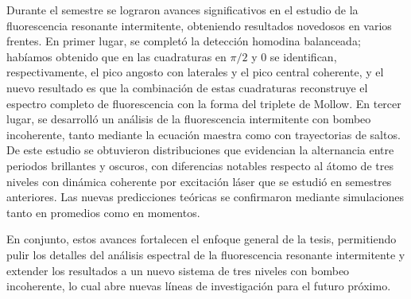 \documentclass[12pt]{article}
\begin{document}
Durante el semestre se lograron avances significativos en el estudio de la fluorescencia resonante intermitente, obteniendo resultados novedosos en varios frentes. En primer lugar, se completó la detección homodina balanceada; habíamos obtenido que en las cuadraturas en $\pi/2$ y $0$ se identifican, respectivamente, el pico angosto con laterales y el pico central coherente, y el nuevo resultado es que la combinación de estas cuadraturas reconstruye el espectro completo de fluorescencia con la forma del triplete de Mollow. En tercer lugar, se desarrolló un análisis de la fluorescencia intermitente con bombeo incoherente, tanto mediante la ecuación maestra como con trayectorias de saltos. De este estudio se obtuvieron distribuciones que evidencian la alternancia entre periodos brillantes y oscuros, con diferencias notables respecto al átomo de tres niveles con dinámica coherente por excitación láser que se estudió en semestres anteriores. Las nuevas predicciones teóricas se confirmaron mediante simulaciones tanto en promedios como en momentos.

En conjunto, estos avances fortalecen el enfoque general de la tesis, permitiendo pulir los detalles del análisis espectral de la fluorescencia resonante intermitente y extender los resultados a un nuevo sistema de tres niveles con bombeo incoherente, lo cual abre nuevas líneas de investigación para el futuro próximo.


\end{document}
